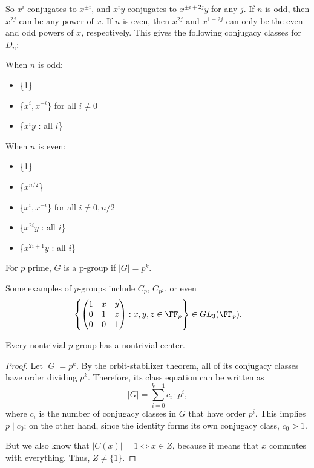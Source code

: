 So $x^i$ conjugates to $x^{\pm i}$, and $x^iy$ conjugates to $x^{\pm i + 2j}y$ for any $j$. If $n$ is odd, then $x^{2j}$ can be any power of $x$. If $n$ is even, then $x^{2j}$ and $x^{1+2j}$ can only be the even and odd powers of $x$, respectively. This gives the following conjugacy classes for $D_n$: 

When $n$ is odd: 
\begin{itemize}
    \item \{1\}
    \item \{$x^i, x^{-i}$\} for all $i\neq 0$
    \item \{$x^iy$ : all $i$\}
\end{itemize}

When $n$ is even: 
\begin{itemize}
    \item \{1\}
    \item \{$x^{n/2}$\}
    \item \{$x^{i}, x^{-i}$\} for all $i\neq 0, n/2$
    \item \{$x^{2i}y$ : all $i$\}
    \item \{$x^{2i+1}y$ : all $i$\}
\end{itemize}

\begin{definition}

For $p$ prime, $G$ is a \ac{p-group} if $\vert G\vert = p^k$.
\end{definition}

Some examples of $p$-groups include $C_p$, $C_{p^2}$, or even
\[\left\{\begin{pmatrix}
1 & x & y \\
0 & 1 & z \\
0 & 0 & 1
\end{pmatrix} : x,y,z\in \FF_p
\right\} \in GL_3(\FF_p).\]

\begin{theorem}
\thmlabel

Every nontrivial $p$-group has a nontrivial center. 
\end{theorem}

\begin{proof}
Let $\vert G\vert = p^k$. By the orbit-stabilizer theorem, all of its conjugacy classes have order dividing $p^k$. Therefore, its class equation can be written as 
\[\vert G\vert = \sum_{i=0}^{k-1}c_i\cdot p^i,\]
where $c_i$ is the number of conjugacy classes in $G$ that have order $p^i$. This implies $p\mid c_0$; on the other hand, since the identity forms its own conjugacy class, $c_0 > 1$.

But we also know that $\vert C(x)\vert = 1\iff x\in Z$, because it means that $x$ commutes with everything. Thus, $Z\neq \{1\}$. 
\end{proof}

